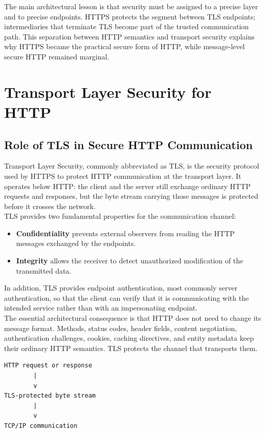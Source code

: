 \documentclass{scrbook}
\begin{document}
The main architectural lesson is that security must be assigned to a precise layer and to precise endpoints. HTTPS protects the segment between TLS endpoints; intermediaries that terminate TLS become part of the trusted communication path. This separation between HTTP semantics and transport security explains why HTTPS became the practical secure form of HTTP, while message-level secure HTTP remained marginal.

\chapter{Transport Layer Security for HTTP}

\section{Role of TLS in Secure HTTP Communication}

Transport Layer Security, commonly abbreviated as TLS, is the security protocol used by HTTPS to protect HTTP communication at the transport layer. It operates below HTTP: the client and the server still exchange ordinary HTTP requests and responses, but the byte stream carrying those messages is protected before it crosses the network.\\

TLS provides two fundamental properties for the communication channel:
\begin{itemize}
	\item \textbf{Confidentiality} prevents external observers from reading the HTTP messages exchanged by the endpoints.
	\item \textbf{Integrity} allows the receiver to detect unauthorized modification of the transmitted data.
\end{itemize}
 In addition, TLS provides endpoint authentication, most commonly server authentication, so that the client can verify that it is communicating with the intended service rather than with an impersonating endpoint.\\

The essential architectural consequence is that HTTP does not need to change its message format. Methods, status codes, header fields, content negotiation, authentication challenges, cookies, caching directives, and entity metadata keep their ordinary HTTP semantics. TLS protects the channel that transports them.

\begin{lstlisting}
HTTP request or response
        |
        v
TLS-protected byte stream
        |
        v
TCP/IP communication
\end{lstlisting}
\end{document}
